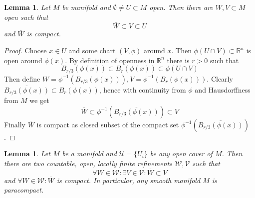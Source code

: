 \documentclass{article}
\numberwithin{theorem}{section}
\newtheorem{lemma}[theorem]{Lemma}
\newcommand{\R}{\mathbb{R}}
\newcommand{\1}{\mathds{1}}
\begin{document}
\begin{lemma}
    Let $M$ be manifold and $\emptyset \neq U\subset M$ open. Then there are $W,V \subset M$ open such that 
    \[ \overline{W} \subset V \subset U \]
    and $\overline{W}$ is compact. 
\end{lemma}
\begin{proof}
    Choose $x \in U$ and some chart $(V, \phi)$ around $x$. Then $\phi(U \cap V) \subset \R^n$ is open around $\phi(x)$. By definition of openness in $\R^n$ there is $r >0 $ such that 
    \[ B_{r/3}(\phi(x)) \subset B_{r}(\phi(x)) \subset \phi(U \cap V)\]
    Then define $W = \phi^{-1}(B_{r/3}(\phi(x))), V = \phi^{-1}(B_{r}(\phi(x)))$. Clearly $\overline{B_{r/3}(\phi(x))} \subset B_r(\phi(x))$, hence with continuity from $\phi$ and Hausdorffness from $M$ we get 
    \[ \overline{W} \subset \phi^{-1}(\overline{B_{r/3}(\phi(x))}) \subset V \]
    Finally $\overline{W}$ is compact as closed subset of the compact set $\phi^{-1}(\overline{B_{r/3}(\phi(x))})$. 
\end{proof}


\begin{lemma}
    Let $M$ be a manifold and $\mathcal{U} = \{ U_i \}$ be any open cover of $M$. Then there are two countable, open, locally finite refinements $\mathcal{W}, \mathcal{V}$ such that 
    \[ \forall W \in \mathcal{W}:  \exists V \in \mathcal{V} : \overline{W} \subset V\]
    and $\forall W \in \mathcal{W}: \overline{W}$ is compact. In particular, any smooth manifold $M$ is paracompact. 
\end{lemma}
\end{document}
